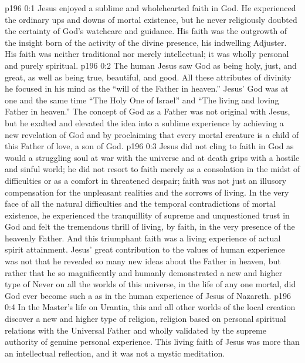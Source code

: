 \author{Midwayer Commission}
\vs p196 0:1 Jesus enjoyed a sublime and wholehearted faith in God. He experienced the ordinary ups and downs of mortal existence, but he never religiously doubted the certainty of God’s watchcare and guidance. His faith was the outgrowth of the insight born of the activity of the divine presence, his indwelling Adjuster. His faith was neither traditional nor merely intellectual; it was wholly personal and purely spiritual.
\vs p196 0:2 The human Jesus saw God as being holy, just, and great, as well as being true, beautiful, and good. All these attributes of divinity he focused in his mind as the “will of the Father in heaven.” Jesus’ God was at one and the same time “The Holy One of Israel” and “The living and loving Father in heaven.” The concept of God as a Father was not original with Jesus, but he exalted and elevated the idea into a sublime experience by achieving a new revelation of God and by proclaiming that every mortal creature is a child of this Father of love, a son of God.
\vs p196 0:3 Jesus did not cling to faith in God as would a struggling soul at war with the universe and at death grips with a hostile and sinful world; he did not resort to faith merely as a consolation in the midst of difficulties or as a comfort in threatened despair; faith was not just an illusory compensation for the unpleasant realities and the sorrows of living. In the very face of all the natural difficulties and the temporal contradictions of mortal existence, he experienced the tranquillity of supreme and unquestioned trust in God and felt the tremendous thrill of living, by faith, in the very presence of the heavenly Father. And this triumphant faith was a living experience of actual spirit attainment. Jesus’ great contribution to the values of human experience was not that he revealed so many new ideas about the Father in heaven, but rather that he so magnificently and humanly demonstrated a new and higher type of  Never on all the worlds of this universe, in the life of any one mortal, did God ever become such a  as in the human experience of Jesus of Nazareth.
\vs p196 0:4 In the Master’s life on Urantia, this and all other worlds of the local creation discover a new and higher type of religion, religion based on personal spiritual relations with the Universal Father and wholly validated by the supreme authority of genuine personal experience. This living faith of Jesus was more than an intellectual reflection, and it was not a mystic meditation.
